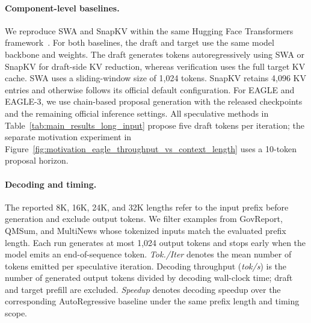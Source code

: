 

\paragraph{Component-level baselines.}
We reproduce SWA and SnapKV within the same Hugging Face Transformers framework~\citep{wolf-etal-2020-transformers}.
For both baselines, the draft and target use the same model backbone and weights.
The draft generates tokens autoregressively using SWA or SnapKV for draft-side KV reduction, whereas verification uses the full target KV cache.
SWA uses a sliding-window size of 1,024 tokens.
SnapKV retains 4,096 KV entries and otherwise follows its official default configuration.
For EAGLE and EAGLE-3, we use chain-based proposal generation with the released checkpoints and the remaining official inference settings.
All speculative methods in Table~\ref{tab:main_results_long_input} propose five draft tokens per iteration; the separate motivation experiment in Figure~\ref{fig:motivation_eagle_throughput_vs_context_length} uses a 10-token proposal horizon.

\paragraph{Decoding and timing.}
The reported 8K, 16K, 24K, and 32K lengths refer to the input prefix before generation and exclude output tokens.
We filter examples from GovReport, QMSum, and MultiNews whose tokenized inputs match the evaluated prefix length.
Each run generates at most 1,024 output tokens and stops early when the model emits an end-of-sequence token.
\textit{Tok./Iter} denotes the mean number of tokens emitted per speculative iteration.
Decoding throughput (\textit{tok/s}) is the number of generated output tokens divided by decoding wall-clock time; draft and target prefill are excluded.
\textit{Speedup} denotes decoding speedup over the corresponding AutoRegressive baseline under the same prefix length and timing scope.

